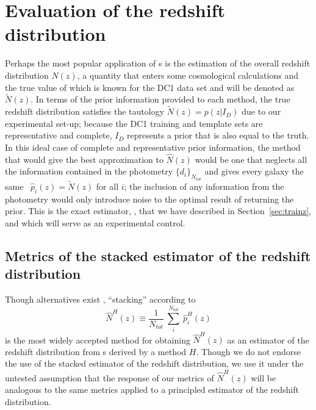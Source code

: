 \appendix

\section{Evaluation of the redshift distribution}
\label{sec:moments}

Perhaps the most popular application of \pzpdf s is the estimation of the overall redshift distribution $N(z)$, a quantity that enters some cosmological calculations and the true value of which is known for the DC1 data set and will be denoted as $\tilde{N}(z)$.
In terms of the prior information provided to each method, the true redshift distribution satisfies the tautology $\tilde{N}(z) = p(z \vert I_{D})$ due to our experimental set-up; because the DC1 training and template sets are representative and complete, $I_{D}$ represents a prior that is also equal to the truth.
In this ideal case of complete and representative prior information, the method that would give the best approximation to $\hat{N}(z)$ would be one that neglects all the information contained in the photometry $\{d_{i}\}_{N_{tot}}$ and gives every galaxy the same \pzpdf\ $\hat{p}_{i}(z) = \tilde{N}(z)$ for all $i$; the inclusion of any information from the photometry would only introduce noise to the optimal result of returning the prior.
This is the exact estimator, \trainz, that we have described in Section~\ref{sec:trainz}, and which will serve as an experimental control.

\subsection{Metrics of the stacked estimator of the redshift distribution}
\label{sec:stackedmetrics}

Though alternatives exist \citep{Malz:chippr}, ``stacking'' according to
\begin{equation}
  \label{eq:stacked}
  \hat{N}^{H}(z) \equiv \frac{1}{N_{tot}}\ \sum_{i}^{N_{tot}}\ \hat{p}^{H}_{i}(z)
\end{equation}
is the most widely accepted method for obtaining $\hat{N}^{H}(z)$ as an estimator of the redshift distribution from \pzpdf s derived by a method $H$.
Though we do not endorse the use of the stacked estimator of the redshift distribution, we use it under the untested assumption that the response of our metrics of $\hat{N}^{H}(z)$ will be analogous to the same metrics applied to a principled estimator of the redshift distribution.

